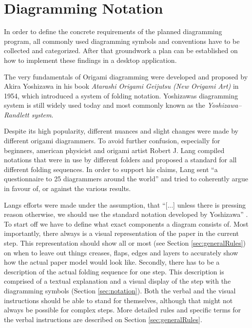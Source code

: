 
\section{Diagramming Notation}
\label{sec:conventions}


In order to define the concrete requirements of the planned diagramming program, all commonly used diagramming symbols and conventions have to be collected and categorized. After that groundwork a plan can be established on how to implement these findings in a desktop application.

The very fundamentals of Origami diagramming were developed and proposed by Akira Yoshizawa in his book \emph{Atarashi Origami Geijutsu (New Origami Art)}\cite{Yoshizawa} in 1954, which introduced a system of folding notation. Yoshizawas diagramming system is still widely used today and most commonly known as the  \emph{Yoshizawa–Randlett system}.

Despite its high popularity, different nuances and slight changes were made by different origami diagrammers.  To avoid further confusion, especially for beginners, american physicist and origami artist Robert J. Lang compiled notations that were in use by different folders and proposed a standard for all different folding sequences. In order to support his claims, Lang sent \enquote{a questionnaire to 25 diagrammers around the world}\cite{Lang} and tried to coherently argue in favour of, or against the various results.

Langs efforts were made under the assumption, that \enquote{[...] unless there is pressing reason otherwise, we should use the standard notation developed by Yoshizawa} \cite{Lang}.\\

To start off we have to define what exact components a diagram consists of. 
Most importantly, there always is a visual representation of the paper in the current step. This representation should show all or most (see Section \ref{sec:generalRules}) on when to leave out things creases, flaps, edges and layers to accurately show how the actual paper model would look like.
Secondly, there has to be a description of the actual folding sequence for one step. This description is comprised of a textual explanation and a visual display of the step with the diagramming symbols (Section \ref{sec:notation}). Both the verbal and the visual instructions should be able to stand for themselves, although that might not always be possible for complex steps. More detailed rules and specific terms for the verbal instructions are described on Section \ref{sec:generalRules}.

